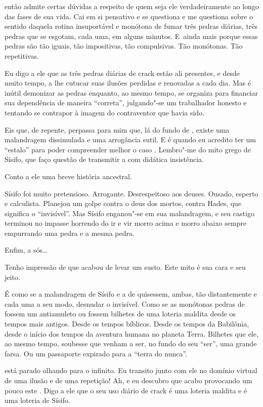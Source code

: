  então admite certas dúvidas a respeito de quem seja ele
verdadeiramente ao longo das fases de sua vida. Cai em si pensativo e se
questiona e me questiona sobre o sentido daquela rotina insuportável e
monótona de fumar três pedras diárias, três pedras que se esgotam, cada
uma, em alguns minutos. E~ainda mais porque essas pedras são tão iguais,
tão impositivas, tão compulsivas. Tão monótonas. Tão repetitivas.

Eu digo a ele que as três pedras diárias de crack estão ali presentes, e
desde muito tempo, a lhe cutucar suas ilusões perdidas e renovadas a
cada dia. Mas é inútil demonizar as pedras enquanto, ao mesmo tempo, 
se organiza para financiar sua dependência de maneira ``correta'',
julgando"-se um trabalhador honesto e tentando se contrapor à imagem do
contraventor que havia sido.

Eis que, de repente, perpassa para mim que, lá do fundo de , existe
uma malandragem dissimulada e uma arrogância sutil. E é quando eu
acredito ter um ``estalo'' para poder compreender melhor o caso .
Lembro"-me do mito grego de Sísifo, que faço questão de transmitir a 
com didática insistência.

Conto a ele uma breve história ancestral.

Sísifo foi muito pretensioso. Arrogante. Desrespeitoso aos deuses.
Ousado, esperto e calculista. Planejou um golpe contra o deus dos
mortos, contra Hades, que significa o ``invisível''. Mas Sísifo
enganou"-se em sua malandragem, e seu castigo terminou no impasse
horrendo do ir e vir morro acima e morro abaixo sempre empurrando uma
pedra e a mesma pedra.

Enfim, a sós…

Tenho impressão de que  acabou de levar um susto. Este mito é sua cara
e seu jeito.

É como se a malandragem de Sísifo e a de  quisessem, ambas, tão
distantemente e cada uma a seu modo, desnudar o invisível. Como se as
monótonas pedras de  fossem um antiamuleto ou fossem bilhetes de uma
loteria maldita desde os tempos mais antigos. Desde os tempos bíblicos.
Desde os tempos da Babilônia, desde o início dos tempos da aventura
humana no planeta Terra. Bilhetes que ele, ao mesmo tempo, soubesse que
venham a ser, no fundo do seu ``ser'', uma grande farsa. Ou um
passaporte expirado para a ``terra do nunca''.

 está parado olhando para o infinito. Eu transito junto com ele no
domínio virtual de uma ilusão e de uma repetição! Ah, e eu descubro que
acabo provocando um pouco este . Digo a ele que o seu uso diário de
crack é uma loteria maldita e é uma loteria de Sísifo.

